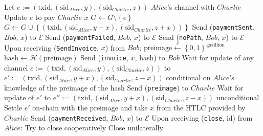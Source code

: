 \begin{algorithmic}[1]
          \State Let $e := \left(\mathrm{txid}, \left(\mathrm{sid}_{Alice}, y\right),
          \left(\mathrm{sid}_{Charlie}, z\right)\right)$ $Alice$'s channel with $Charlie$
          \State Update $e$ to pay $Charlie$ $x$ 
          \State $G \leftarrow G \setminus \left\{e\right\}$
          \State $G \leftarrow G \cup \left\{\left(\mathrm{txid},
          \left(\mathrm{sid}_{Alice}, y - x\right), \left(\mathrm{sid}_{Charlie}, z +
          x\right)\right)\right\}$
          \State Send (\texttt{paymentSent}, $Bob$, $x$) to $\mathcal{E}$
        \Else
          \State Send (\texttt{paymentFailed}, $Bob$, $x$) to $\mathcal{E}$
        \EndIf
      \Else
        \State Send (\texttt{noPath}, $Bob$, $x$) to $\mathcal{E}$
      \EndIf
    \State
    \State Upon receiving (\texttt{SendInvoice}, $x$) from $Bob$:
      \State $\mathrm{preimage} \overset{r}{\leftarrow}
      \left\{0,1\right\}^{\mathrm{gazillion}}$
      \State $\mathrm{hash} \leftarrow \mathcal{H}\left(\mathrm{preimage}\right)$
      \State Send (\texttt{invoice}, $x$, hash) to $Bob$
      \State Wait for update of any channel $e := \left(\mathrm{txid},
      \left(\mathrm{sid}_{Alice}, y\right), \left(\mathrm{sid}_{Charlie}, z\right)\right)$
      to $e' := \left(\mathrm{txid}, \left(\mathrm{sid}_{Alice}, y + x\right),
      \left(\mathrm{sid}_{Charlie}, z - x\right)\right)$ conditional on $Alice$'s
      knowledge of the preimage of the hash
      \State Send (\texttt{preimage}) to $Charlie$
      \State Wait for update of $e'$ to $e'' := \left(\mathrm{txid},
      \left(\mathrm{sid}_{Alice}, y + x\right), \left(\mathrm{sid}_{Charlie}, z -
      x\right)\right)$ unconditional
        \State Settle $e'$ on-chain with the preimage and take $x$ from the HTLC provided
        by $Charlie$
      \EndIf
      \State Send (\texttt{paymentReceived}, $Bob$, $x$) to $\mathcal{E}$
    \State
    \State Upon receiving (\texttt{close}, id) from $Alice$:
        \State Try to close cooperatively 
         
          \State Close unilaterally 
        \EndIf
      \EndIf
  \end{algorithmic}
\hrulefill
\ \\ 
  \label{alg:temp:formalfledger}
